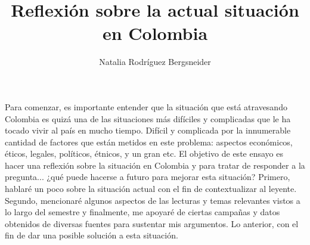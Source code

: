 \documentclass[doc, 12pt, letterpaper, donotrepeattitle, floatsintext, natbib]{apa7}
\title{\Large Reflexión sobre la actual situación en Colombia}
\author{Natalia Rodríguez Bergsneider}
\affiliation{Universidad de los Andes\\ Constitución y Democracia DERE 1300\\ Codigo: 201923806}
\begin{document}
\vspace*{-2cm}      %
\maketitle          %



\doublespacing %
Para comenzar, es importante entender que la situación que está atravesando Colombia es quizá una de las situaciones más difíciles y complicadas que le ha tocado vivir al país en mucho tiempo. Difícil y complicada por la innumerable cantidad de factores que están metidos en este problema: aspectos económicos, éticos, legales, políticos, étnicos, y un gran etc. El objetivo de este ensayo es hacer una reflexión sobre la situación en Colombia y para tratar de responder a la pregunta... ¿qué puede hacerse a futuro para mejorar esta situación? Primero, hablaré un poco sobre la situación actual con el fin de contextualizar al leyente. Segundo, mencionaré algunos aspectos de las lecturas y temas relevantes vistos a lo largo del semestre y finalmente, me apoyaré de ciertas campañas y datos obtenidos de diversas fuentes para sustentar mis argumentos. Lo anterior, con el fin de dar una posible solución a esta situación.
\noindent {}\\
\end{document}
